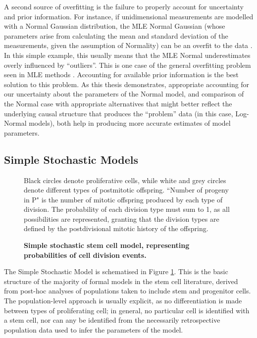 A second source of overfitting is the failure to properly account for uncertainty and prior information. For instance, if unidimensional measurements are modelled with a Normal Gaussian distribution, the MLE Normal Gaussian (whose parameters arise from calculating the mean and standard deviation of the measurements, given the assumption of Normality) can be an overfit to the data \cite[p.28]{Bishop2006}. In this simple example, this usually means that the MLE Normal underestimates overly influenced by ``outliers''. This is one case of the general overfitting problem seen in MLE methods \cite{Green2017}. Accounting for available prior information is the best solution to this problem. As this thesis demonstrates, appropriate accounting for our uncertainty about the parameters of the Normal model, and comparison of the Normal case with appropriate alternatives that might better reflect the underlying causal structure that produces the ``problem'' data (in this case, Log-Normal models), both help in producing more accurate estimates of model parameters.
 
\subsection{Simple Stochastic Models}
\label{ssec:SSM}

\begin{figure}
\caption{{\bf Simple stochastic stem cell model, representing probabilities of cell division events.}} Black circles denote proliferative cells, while white and grey circles denote different types of postmitotic offspring. ``Number of progeny in P" is the number of mitotic offspring produced by each type of division. The probability of each division type must sum to 1, as all possibilities are represented, granting that the division types are defined by the postdivisional mitotic history of the offspring.
\label{fig:SSM}
\end{figure}

The Simple Stochastic Model is schematised in Figure \ref{fig:SSM}. This is the basic structure of the majority of formal models in the stem cell literature, derived from post-hoc analyses of populations taken to include stem and progenitor cells. The population-level approach is usually explicit, as no differentiation is made between types of proliferating cell; in general, no particular cell is identified with a stem cell, nor can any be identified from the necessarily retrospective population data used to infer the parameters of the model. 

